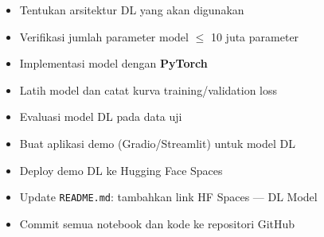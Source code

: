 \documentclass[11pt,a4paper]{article}
\begin{document}
\vspace{0.5em}

\begin{tcolorbox}[enhanced, colback=checkpointbg, colframe=itera!40!orange, fonttitle=\bfseries,
  title={Checkpoint 3 --- 22 April 2026: Model Deep Learning (PyTorch)}]
\begin{itemize}[leftmargin=1.5em, label=$\square$, noitemsep]
  \item Tentukan arsitektur DL yang akan digunakan
  \item Verifikasi jumlah parameter model $\leq$ 10 juta parameter
  \item Implementasi model dengan \textbf{PyTorch}
  \item Latih model dan catat kurva training/validation loss
  \item Evaluasi model DL pada data uji
  \item Buat aplikasi demo (Gradio/Streamlit) untuk model DL
  \item Deploy demo DL ke Hugging Face Spaces
  \item Update \texttt{README.md}: tambahkan link HF Spaces --- DL Model
  \item Commit semua notebook dan kode ke repositori GitHub
\end{itemize}
\end{tcolorbox}

\vspace{0.5em}
\end{document}
